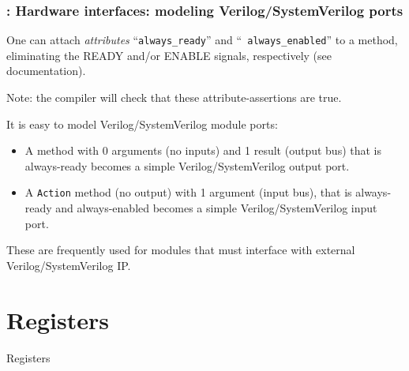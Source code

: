 \begin{frame}
\frametitle{{\BSV}: Hardware interfaces: modeling Verilog/SystemVerilog ports}

\footnotesize

One can attach \emph{attributes} ``{\tt always\_ready}'' and ``{\tt
always\_enabled}'' to a {\BSV} method, eliminating the READY and/or
ENABLE signals, respectively (see documentation).

\vspace{1ex}

Note: the {\bsc} compiler will check that these attribute-assertions are true.

\vspace{4ex}

It is easy to model Verilog/SystemVerilog module ports:
\begin{itemize}

 \item A {\BSV} method with 0 arguments (no inputs) and 1 result
       (output bus) that is always-ready becomes a simple
       Verilog/SystemVerilog output port.

 \item A {\BSV} {\tt Action} method (no output) with 1 argument (input
       bus), that is always-ready and always-enabled becomes a simple
       Verilog/SystemVerilog input port.
\end{itemize}

These are frequently used for {\BSV} modules that must interface with
external Verilog/SystemVerilog IP.

\end{frame}


\section{Registers}


\begin{frame}

\begin{center}
  {\LARGE Registers}
\end{center}

\end{frame}


